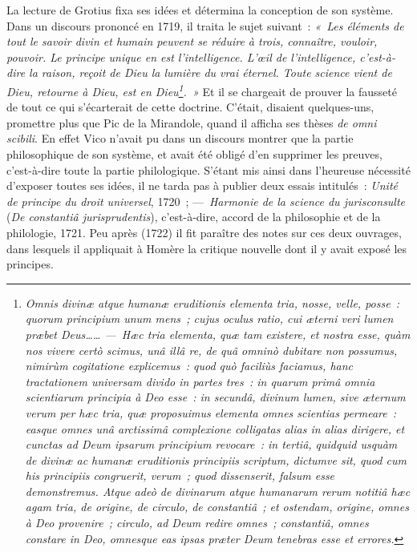 \documentclass[french,twoside]{book} %
\begin{document}
La lecture de Grotius fixa ses idées et détermina  la conception de son système. Dans un discours prononcé en 1719, il traita le sujet suivant : \emph{« Les éléments de tout le savoir divin et humain peuvent se réduire à trois, {\itshape connaître, vouloir, pouvoir}. Le principe unique en est l’intelligence. L’œil de l’intelligence, c’est-à-dire la raison, reçoit de Dieu la lumière du vrai éternel. Toute science vient de Dieu, retourne à Dieu, est en Dieu\footnote{{\itshape Omnis divinæ atque humanæ eruditionis elementa tria, nosse, velle, posse : quorum principium unum mens ; cujus oculus ratio, cui æterni veri lumen præbet Deus…… — Hæc tria elementa, quæ tam existere, et nostra esse, quàm nos vivere certò scimus, unâ illâ re, de quâ omninò dubitare non possumus, nimirùm cogitatione explicemus : quod quò faciliùs faciamus, hanc tractationem universam divido in partes tres : in quarum primâ omnia scientiarum principia à Deo esse : in secundâ, divinum lumen, sive æternum verum per hæc tria, quæ proposuimus elementa omnes scientias permeare : easque omnes unâ arctissimâ complexione colligatas alias in alias dirigere, et cunctas ad Deum ipsarum principium revocare : in tertiâ, quidquid usquàm de divinæ ac humanæ eruditionis principiis scriptum, dictumve sit, quod cum his principiis congruerit, verum ; quod dissenserit, falsum esse demonstremus. Atque adeò de divinarum atque humanarum rerum notitiâ hæc agam tria, de origine, de circulo, de constantiâ ; et ostendam, origine, omnes à Deo provenire ; circulo, ad Deum redire omnes ; constantiâ, omnes constare in Deo, omnesque eas ipsas præter Deum tenebras esse et errores.}}. »} Et il se chargeait de prouver la fausseté de tout ce qui s’écarterait de cette doctrine. C’était, disaient quelques-uns, promettre plus que Pic de la Mirandole, quand il afficha ses thèses {\itshape de omni scibili}. En effet Vico n’avait pu dans un discours montrer que la partie philosophique de son système, et avait été obligé  d’en supprimer les preuves, c’est-à-dire toute la partie philologique. S’étant mis ainsi dans l’heureuse nécessité d’exposer toutes ses idées, il ne tarda pas à publier deux essais intitulés : {\itshape Unité de principe du droit universel}, 1720 ; — {\itshape Harmonie de la science du jurisconsulte} ({\itshape De constantiâ jurisprudentis}), c’est-à-dire, accord de la philosophie et de la philologie, 1721. Peu après (1722) il fit paraître des notes sur ces deux ouvrages, dans lesquels il appliquait à Homère la critique nouvelle dont il y avait exposé les principes.\par
\end{document}

